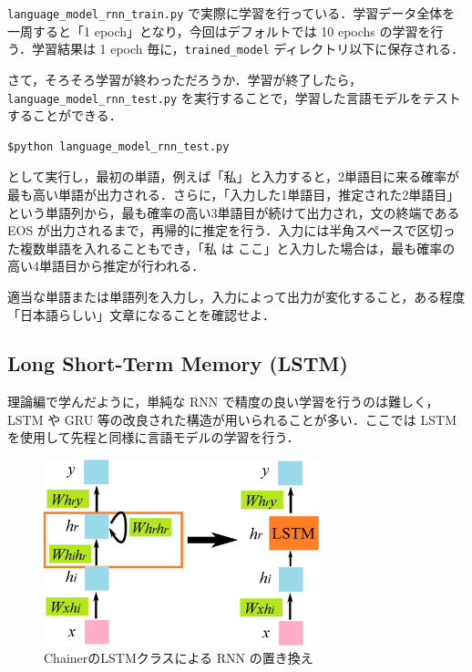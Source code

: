 \verb+language_model_rnn_train.py+ で実際に学習を行っている．学習データ全体を一周すると「1 epoch」となり，今回はデフォルトでは 10 epochs の学習を行う．学習結果は 1 epoch 毎に，\verb+trained_model+ ディレクトリ以下に保存される．

さて，そろそろ学習が終わっただろうか．学習が終了したら，\verb+language_model_rnn_test.py+ を実行することで，学習した言語モデルをテストすることができる．
  \begin{lstlisting}[basicstyle=\ttfamily\footnotesize, frame=single]
   $python language_model_rnn_test.py
  \end{lstlisting}
として実行し，最初の単語，例えば「私」と入力すると，2単語目に来る確率が最も高い単語が出力される．さらに，「入力した1単語目，推定された2単語目」という単語列から，最も確率の高い3単語目が続けて出力され，文の終端である EOS が出力されるまで，再帰的に推定を行う．入力には半角スペースで区切った複数単語を入れることもでき，「私 は ここ」と入力した場合は，最も確率の高い4単語目から推定が行われる．
 \begin{practice}
   適当な単語または単語列を入力し，入力によって出力が変化すること，ある程度「日本語らしい」文章になることを確認せよ．
 \end{practice}
 \newpage

  \subsection{Long Short-Term Memory (LSTM)}
 理論編で学んだように，単純な RNN で精度の良い学習を行うのは難しく，LSTM や GRU 等の改良された構造が用いられることが多い．ここでは LSTM を使用して先程と同様に言語モデルの学習を行う．

  \begin{figure}[htb]
   \centering
   \includegraphics[width=80mm]{images/TsuruokaLab/lstm.eps}
   \caption{ChainerのLSTMクラスによる RNN の置き換え}
   \label{fig:lstm}
  \end{figure}

